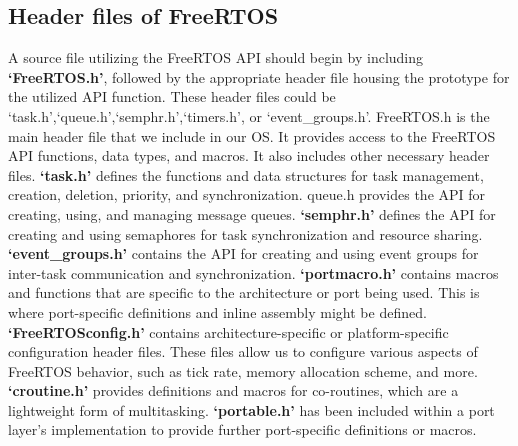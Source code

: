 \subsection{Header files of FreeRTOS}

A source file utilizing the FreeRTOS API should begin by including \textbf{‘FreeRTOS.h’}, followed by the appropriate header file housing the prototype for the utilized API function. These header files could be ‘task.h’,‘queue.h’,‘semphr.h’,‘timers.h’, or ‘event\_groups.h’. FreeRTOS.h is the main header file that we include in our OS. It provides access to the FreeRTOS API functions, data types, and macros. It also includes other necessary header files.
\textbf{‘task.h’} defines the functions and data structures for task management, creation, deletion, priority, and synchronization. queue.h provides the API for creating, using, and managing message queues. \textbf{‘semphr.h’} defines the API for creating and using semaphores for task synchronization and resource sharing. \textbf{‘event\_groups.h’} contains the API for creating and using event groups for inter-task communication and synchronization. \textbf{‘portmacro.h’} contains macros and functions that are specific to the architecture or port being used. This is where port-specific definitions and inline assembly might be defined. \textbf{‘FreeRTOSconfig.h’} contains architecture-specific or platform-specific configuration header files. These files allow us to configure various aspects of FreeRTOS behavior, such as tick rate, memory allocation scheme, and more. \textbf{‘croutine.h’} provides definitions and macros for co-routines, which are a lightweight form of multitasking. \textbf{‘portable.h’} has been included within a port layer's implementation to provide further port-specific definitions or macros.

